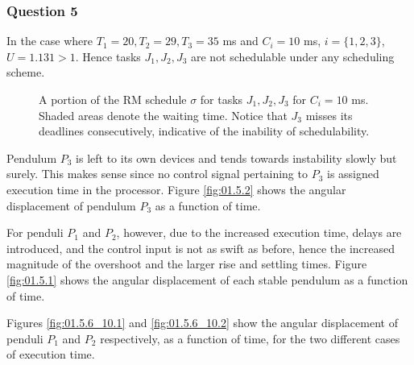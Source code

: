 \subsubsection{Question 5}
In the case where $T_1 = 20, T_2 = 29, T_3 = 35$ ms and $C_i = 10$ ms,
$i=\{1,2,3\}$, $U=1.131 > 1$. Hence tasks $J_1, J_2, J_3$ are not schedulable
under any scheduling scheme.


\begin{figure}[H]\centering
  \scalebox{0.7}{}
  \caption{A portion of the RM schedule $\sigma$ for tasks $J_1, J_2, J_3$ for
    $C_i = 10$ ms.  Shaded areas denote the waiting time. Notice that $J_3$
    misses its deadlines consecutively, indicative of the inability of
    schedulability.}
\end{figure}

Pendulum $P_3$ is left to its own devices and tends towards instability slowly
but surely. This makes sense since no control signal pertaining to $P_3$ is
assigned execution time in the processor. Figure \ref{fig:01.5.2} shows the
angular displacement of pendulum $P_3$ as a function of time.

For penduli $P_1$ and $P_2$, however, due to the increased execution time,
delays are introduced, and the control input is not as swift as before,
hence the increased magnitude of the overshoot and the larger rise and settling
times. Figure \ref{fig:01.5.1} shows the angular displacement of each stable
pendulum as a function of time.

Figures \ref{fig:01.5.6_10.1} and \ref{fig:01.5.6_10.2} show the angular
displacement of penduli $P_1$ and $P_2$ respectively, as a function of time, for
the two different cases of execution time.


\noindent{}



